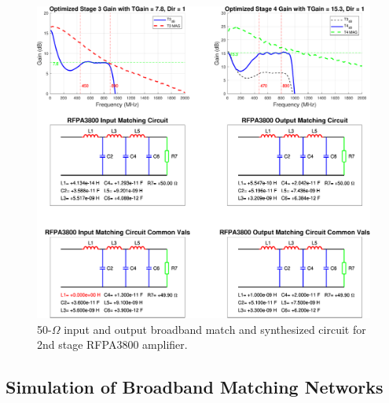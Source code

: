 \begin{figure}[p]
\centering
  \includegraphics[width=1\linewidth]{figs/matching/14-Oct-2018_RFPA3800_srft_results_sequential}   
    \caption{50-$\Omega$ input and output broadband match and synthesized circuit for 2nd stage RFPA3800 amplifier.}
\label{fig_srft_rfpa}
\end{figure}


\pagebreak




\subsection{Simulation of Broadband Matching Networks}
\label{sec_broadband_ideal}


